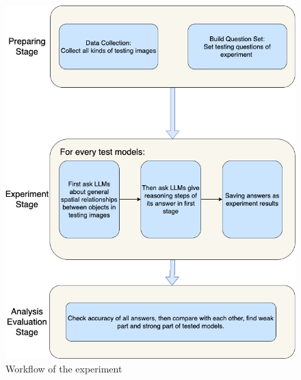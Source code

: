 \documentclass[journal,10pt]{IEEEtran}
\begin{document}
\begin{figure}[htbp]
    \centering
    \includegraphics[width=0.8\linewidth]{./pic/workflow.drawio.png}
    \caption{Workflow of the experiment}
    \label{fig:workflow}
\end{figure}
\end{document}
